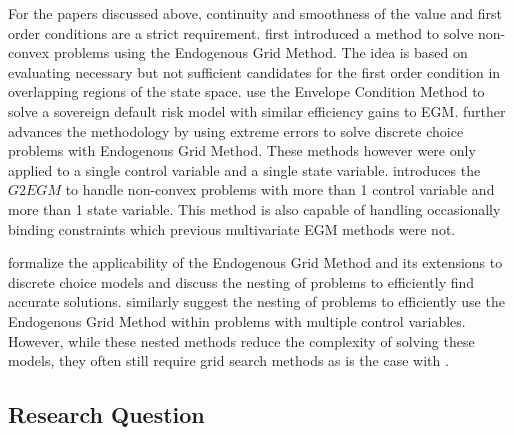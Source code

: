 \documentclass[\econtexRoot/SequentialEGM]{subfiles}
\begin{document}
For the papers discussed above, continuity and smoothness of the value and first order conditions are a strict requirement. \cite{Fella2014-my} first introduced a method to solve non-convex problems using the Endogenous Grid Method. The idea is based on evaluating necessary but not sufficient candidates for the first order condition in overlapping regions of the state space. \cite{Arellano2016-wh} use the Envelope Condition Method to solve a sovereign default risk model with similar efficiency gains to EGM. \cite{Iskhakov2017-my} further advances the methodology by using extreme errors to solve discrete choice problems with Endogenous Grid Method. These methods however were only applied to a single control variable and a single state variable. \cite{Druedahl2017-vn} introduces the $G2EGM$ to handle non-convex problems with more than 1 control variable and more than 1 state variable. This method is also capable of handling occasionally binding constraints which previous multivariate EGM methods were not.

\cite{Clausen2020-zo} formalize the applicability of the Endogenous Grid Method and its extensions to discrete choice models and discuss the nesting of problems to efficiently find accurate solutions.  \cite{Druedahl2021-wl} similarly suggest the nesting of problems to efficiently use the Endogenous Grid Method within problems with multiple control variables. However, while these nested methods reduce the complexity of solving these models, they often still require grid search methods as is the case with \cite{Druedahl2021-wl}.



\subsection{Research Question} %

\end{document}
